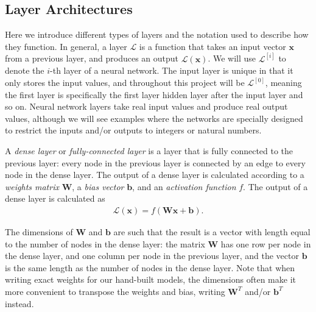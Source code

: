 \documentclass{somasmsc}
\begin{document}
\subsection{Layer Architectures}

Here we introduce different types of layers and the notation used to describe how they function. In general, a layer $\mathcal{L}$ is a function that takes an input vector $\pmb{x}$ from a previous layer, and produces an output $\mathcal{L}\left(\pmb{x}\right)$. We will use $\mathcal{L}^{\left[i\right]}$ to denote the $i$-th layer of a neural network. The input layer is unique in that it only stores the input values, and throughout this project will be $\mathcal{L}^{\left[0\right]}$, meaning the first layer is specifically the first layer hidden layer after the input layer and so on. Neural network layers take real input values and produce real output values, although we will see examples where the networks are specially designed to restrict the inputs and/or outputs to integers or natural numbers.

A \textit{dense layer} or \textit{fully-connected layer} is a layer that is fully connected to the previous layer: every node in the previous layer is connected by an edge to every node in the dense layer. The output of a dense layer is calculated according to a \textit{weights matrix} $\mathbf{W}$, a \textit{bias vector} $\pmb{b}$, and an \textit{activation function} $f$. The output of a dense layer is calculated as
\begin{align*}
\mathcal{L}\left(\pmb{x}\right) = f(\mathbf{W}\pmb{x} + \pmb{b}).
\end{align*}

The dimensions of $\mathbf{W}$ and $\pmb{b}$ are such that the result is a vector with length equal to the number of nodes in the dense layer: the matrix $\mathbf{W}$ has one row per node in the dense layer, and one column per node in the previous layer, and the vector $\pmb{b}$ is the same length as the number of nodes in the dense layer. Note that when writing exact weights for our hand-built models, the dimensions often make it more convenient to transpose the weights and bias, writing $\mathbf{W}^T$ and/or $\pmb{b}^T$ instead.
\end{document}

